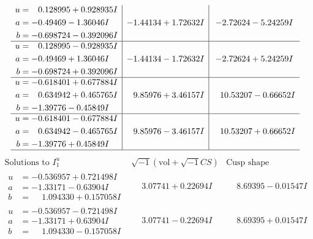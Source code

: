 \documentclass[1p]{elsarticle_modified}
\theoremstyle{definition}
\newcommand{\I}{\sqrt{-1}}
\begin{document}
$$\begin{array}{c|c|c}
\begin{aligned}
u &= \phantom{-}0.128995 + 0.928935 I \\
a &= -0.49469 - 1.36046 I \\
b &= -0.698724 - 0.392096 I\end{aligned}
 & -1.44134 + 1.72632 I & -2.72624 - 5.24259 I \\ \hline\begin{aligned}
u &= \phantom{-}0.128995 - 0.928935 I \\
a &= -0.49469 + 1.36046 I \\
b &= -0.698724 + 0.392096 I\end{aligned}
 & -1.44134 - 1.72632 I & -2.72624 + 5.24259 I \\ \hline\begin{aligned}
u &= -0.618401 + 0.677884 I \\
a &= \phantom{-}0.634942 + 0.465765 I \\
b &= -1.39776 - 0.45849 I\end{aligned}
 & \phantom{-}9.85976 + 3.46157 I & \phantom{-}10.53207 - 0.66652 I \\ \hline\begin{aligned}
u &= -0.618401 - 0.677884 I \\
a &= \phantom{-}0.634942 - 0.465765 I \\
b &= -1.39776 + 0.45849 I\end{aligned}
 & \phantom{-}9.85976 - 3.46157 I & \phantom{-}10.53207 + 0.66652 I\\
 \hline 
 \end{array}$$\newpage$$\begin{array}{c|c|c}  
\text{Solutions to }I^u_{1}& \I (\text{vol} + \sqrt{-1}CS) & \text{Cusp shape}\\
 \hline 
\begin{aligned}
u &= -0.536957 + 0.721498 I \\
a &= -1.33171 - 0.63904 I \\
b &= \phantom{-}1.094330 + 0.157058 I\end{aligned}
 & \phantom{-}3.07741 + 0.22694 I & \phantom{-}8.69395 - 0.01547 I \\ \hline\begin{aligned}
u &= -0.536957 - 0.721498 I \\
a &= -1.33171 + 0.63904 I \\
b &= \phantom{-}1.094330 - 0.157058 I\end{aligned}
 & \phantom{-}3.07741 - 0.22694 I & \phantom{-}8.69395 + 0.01547 I \\ \hline\begin{aligned}

\end{aligned}
\end{array}$$
\end{document}
